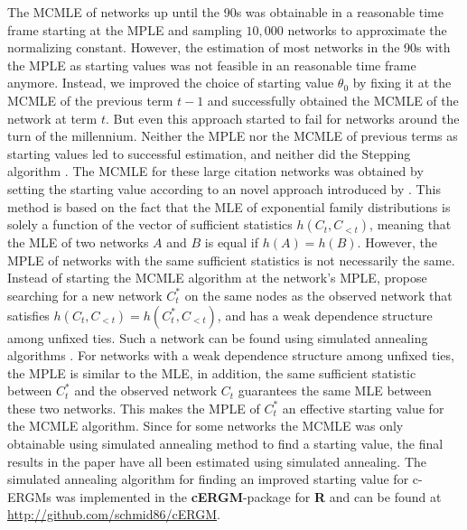 \documentclass{cup-pan}
\begin{document}
The MCMLE of networks up until the 90s was obtainable in a reasonable time frame starting at the MPLE and sampling $10,000$ networks to approximate the normalizing constant. However, the estimation of most networks in the 90s with the MPLE as starting values was not feasible in an reasonable time frame anymore. Instead, we improved the choice of starting value $\theta_0$ by fixing it at the MCMLE of the previous term $t-1$ and successfully obtained the MCMLE of the network at term $t$. But even this approach started to fail for networks around the turn of the millennium. Neither the MPLE nor the MCMLE of previous terms as starting values led to successful estimation, and neither did the Stepping algorithm \citep{hummel2012improving}. 
The MCMLE for these large citation networks was obtained by setting the starting value according to an novel approach introduced by \citet{SchmidHunter2020}. This method is based on the fact that the MLE of exponential family distributions is solely a function of the vector of sufficient statistics $h(C_t, C_{<t})$, meaning that the MLE of two networks $A$ and $B$ is equal if $h(A)=h(B)$. However, the MPLE of networks with the same sufficient statistics is not necessarily the same. Instead of starting the MCMLE algorithm at the network's MPLE, \citet{SchmidHunter2020} propose searching for a new network $C_t^*$ on the same nodes as the observed network that satisfies $h(C_t, C_{<t}) = h(C_t^*, C_{<t})$, and has a weak dependence structure among unfixed ties. Such a network can be found using simulated annealing algorithms \citep{Kirkpatrick83}. For networks with a weak dependence structure among unfixed ties, the MPLE is similar to the MLE, in addition, the same sufficient statistic between $C_t^*$ and the observed network $C_t$ guarantees the same MLE between these two networks. This makes the MPLE of $C_t^*$ an effective starting value for the MCMLE algorithm. Since for some networks the MCMLE was only obtainable using simulated annealing method to find a starting value, the final results in the paper have all been estimated using simulated annealing.
The simulated annealing algorithm for finding an improved starting value for c-ERGMs was implemented in the \textbf{cERGM}-package for \textbf{R} \citep{RCore} and can be found at \url{http://github.com/schmid86/cERGM}.
\end{document}
